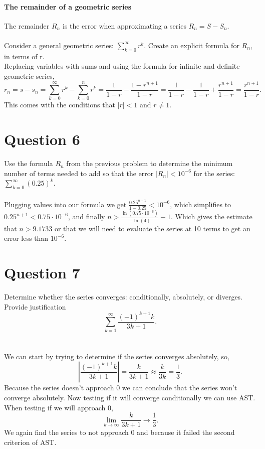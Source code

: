 \documentclass[a4paper]{article}
\begin{document}
\paragraph{The remainder of a geometric series \\} 

The remainder $ R_n $ is the error when approximating a series $ R_n = S- S_n $. \\ \\

Consider a general geometric series: $ \sum_{ k=0 } ^{ \infty } r^{ k } $. Create an explicit formula for $ R_n $, in terms of r. \\

Replacing variables with sums and using the formula for infinite and definite geometric series,
\[
r_n = s - s_n = \sum_{ k=0 } ^{ \infty } r^{ k } - \sum_{ k=0 } ^{ n } r^{ k } = \frac{ 1 }{ 1-r } - \frac{ 1-r^{ n+1 } }{ 1-r } = \frac{ 1 }{ 1-r } - \frac{ 1 }{ 1-r } + \frac{ r^{ n+1 } }{ 1-r } = \frac{ r^{ n+1 } }{ 1-r }
.\] 
This comes with the conditions that $ \left| r \right| < 1 $ and $ r \neq 1 $.

\section*{Question 6}%
\label{sec:Question 6}
Use the formula $ R_n $ from the previous problem to determine the minimum number of terms needed to add so that the error $ \left| R_n \right| < 10^{ -6 } $ for the series: $ \sum_{ k=0 } ^{ \infty } \left( 0.25 \right) ^{ k } $. \\ \\ 

Plugging values into our formula we get $ \frac{ 0.25^{ n+1 } }{ 1-0.25 } < 10^{ -6 } $, which simplifies to $ 0.25^{ n+1 } < 0.75 \cdot 10^{ -6 } $, and finally $  n > \frac{ \ln \left( 0.75\cdot 10^{ -6 } \right)  }{ -\ln\left( 4 \right)  } - 1  $. Which gives the estimate that $ n> 9.1733 $ or that we will need to evaluate the series at 10 terms to get an error less than $ 10^{ -6 } $.


\section*{Question 7}%
\label{sec:Question 7}
Determine whether the series converges: conditionally, absolutely, or diverges. Provide justification
\[
\sum_{ k=1 } ^{ \infty } \frac{ \left( -1 \right) ^{ k+1 }k }{ 3k+1 }
.\]
\\ \\ 
We can start by trying to determine if the series converges absolutely, so,
\[
\left| \frac{ \left( -1 \right) ^{ k+1 }k }{ 3k+1 } \right|= \frac{ k }{ 3k+1 } \approx \frac{ k }{ 3k } =\frac{ 1 }{ 3 } 
.\] 
Because the series doesn't approach 0 we can conclude that the series won't converge absolutely. Now testing if it will converge conditionally we can use AST. When testing if we will approach 0,
\[
\lim_{ k \to \infty} \frac{ k }{ 3k+1 } \to \frac{ 1 }{ 3 }
.\] 
We again find the series to not approach 0 and because it failed the second criterion of AST. 
\end{document}

